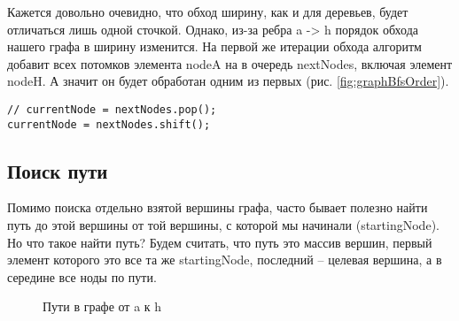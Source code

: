 \documentclass[../article.tex]{subfiles}
\begin{document}
Кажется довольно очевидно, что обход ширину, как и для деревьев, будет отличаться лишь одной сточкой. Однако, из-за ребра {\firacodebold a -> h} порядок обхода нашего графа в ширину изменится. На первой же итерации обхода алгоритм добавит всех потомков элемента {\firacodebold nodeA} на в очередь {\firacodebold nextNodes}, включая элемент {\firacodebold nodeH}. А значит он будет обработан одним из первых (рис. \ref{fig:graphBfsOrder}).

\begin{ruledelement}
    \begin{lstlisting}[caption={Отличие обхода в ширину от обхода в глубину}, label={lst:graphBfsDiff}]
// currentNode = nextNodes.pop();
currentNode = nextNodes.shift();
    \end{lstlisting}
\end{ruledelement}

\subsection{Поиск пути}

Помимо поиска отдельно взятой вершины графа, часто бывает полезно найти путь до этой вершины от той вершины, с которой мы начинали ({\firacodebold startingNode}). Но что такое найти путь? Будем считать, что путь это массив вершин, первый элемент которого это все та же {\firacodebold startingNode}, последний – целевая вершина, а в середине все ноды по пути.

\begin{figure}
    \caption{Пути в графе от {\firacodebold a} к {\firacodebold h}}
    \label{fig:pathExposure}
\end{figure}
\end{document}
